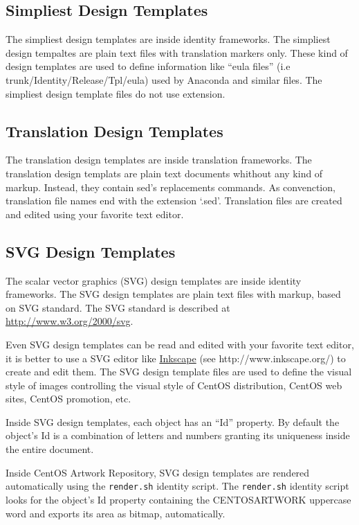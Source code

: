 \subsection{Simpliest Design Templates}

The simpliest design templates are inside identity frameworks. The
simpliest design tempaltes are plain text files with translation
markers only.  These kind of design templates are used to define
information like ``eula files'' (i.e trunk/Identity/Release/Tpl/eula)
used by Anaconda and similar files.  The simpliest design template
files do not use extension.

\subsection{Translation Design Templates} 

The translation design templates are inside translation frameworks.
The translation design templats are plain text documents whithout any
kind of markup.  Instead, they contain sed's replacements commands.
As convenction, translation file names end with the extension `.sed'.
Translation files are created and edited using your favorite text
editor.

\subsection{SVG Design Templates}

The scalar vector graphics (SVG) design templates are inside identity
frameworks.  The SVG design templates are plain text files with
markup, based on SVG standard. The SVG standard is described at
\href{http://www.w3.org/2000/svg}{http://www.w3.org/2000/svg}. 

Even SVG design templates can be read and edited with your favorite
text editor, it is better to use a SVG editor like
\href{http://www.inkscape.org/}{Inkscape} (see
http://www.inkscape.org/) to create and edit them. The SVG design
template files are used to define the visual style of images
controlling the visual style of CentOS distribution, CentOS web sites,
CentOS promotion, etc.

Inside SVG design templates, each object has an ``Id'' property.  By
default the object's Id is a combination of letters and numbers
granting its uniqueness inside the entire document.  

Inside CentOS Artwork Repository, SVG design templates are rendered
automatically using the \texttt{render.sh} identity script.  The
\texttt{render.sh} identity script looks for the object's Id property
containing the CENTOSARTWORK uppercase word and exports its area as
bitmap, automatically.

